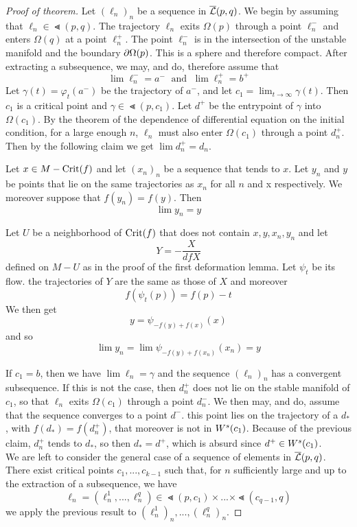\begin{proof}[Proof of theorem]
    Let $(\ell_n)_n$ be a sequence in ${\overline{\mathcal{L}} }(p, q)$.
    We begin by assuming that $\ell_n \in \Lt(p, q)$. The trajectory $\ell_n$ exits 
    $\Omega(p)$ through a point $\ell_n^-$ and enters $\Omega(q)$ at a point $\ell_n^+$.
    The point $\ell_n^-$ is in the intersection of the unstable manifold and the boundary
    ${ \partial } \Omega (p)$. This is a sphere and therefore compact. After extracting a 
    subsequence, we may, and do, therefore assume that
    \[ \lim \ell_n^- = a^- \; \text{ and } \; \lim \ell_n^+ = b^+ \]
    Let $\gamma(t) = \varphi_t(a^-)$ be the trajectory of $a^-$, and let 
    $c_1 = \lim_{t \to \infty} \gamma(t)$. Then $c_1$ is a critical point and 
    $\gamma \in \Lt (p, c_1)$. Let $d^+$ be the entrypoint of $\gamma$ into
    $\Omega (c_1)$. By the theorem of the dependence of differential equation on the 
    initial condition, for a large enough $n$, $\ell_n$ must also enter $\Omega(c_1)$
    through a point $d_n^+$. Then by the following claim we get $\lim d_n^+ = d_n$.
    \begin{claim*}
        Let $x \in M - { \operatorname{Crit} } (f)$ and let $(x_n)_n$ be a sequence that tends to $x$.
        Let $y_n$ and $y$ be points that lie on the same trajectories as $x_n$ for all
        $n$ and x respectively. We moreover suppose that $f(y_n) = f(y)$. Then 
        \[ \lim y_n = y \]
    \end{claim*}
    \begin{smallproof}
        Let $U$ be a neighborhood of ${ \operatorname{Crit} } (f)$ that does not contain 
        $x, y, x_n, y_n$ and let 
        \[ Y = - \frac{X}{dfX} \]
        defined on $M - U$ as in the proof of the first deformation lemma. Let 
        $\psi_t$ be its flow. the trajectories of $Y$ are the same as those of $X$
        and moreover 
        \[ f(\psi_t(p)) = f(p) - t \]
        We then get
        \[ y = \psi_{- f(y) + f(x)}(x)\]
        and so
        \[ \lim y_n = \lim \psi_{-f(y) + f(x_n)} (x_n) = y \]
    \end{smallproof}
    If $c_1 = b$, then we have $\lim \ell_n = \gamma$ and the sequence $(\ell_n)_n$ has a 
    convergent subsequence. If this is not the case, then $d_n^+$ does not lie on
    the stable manifold of $c_1$, so that $\ell_n$ exits $\Omega (c_1)$ through a point
    $d_n^-$. We then may, and do, assume that the sequence converges to a point 
    $d^-$. this point lies on the trajectory of a $d_{\ast}$, with 
    $f(d_{\ast}) = f(d_n^+)$, that moreover is not in ${ W^s } (c_1)$. Because of the 
    previous claim, $d_n^+$ tends to $d_{\ast}$, so then $d_{\ast} = d^+$, which is
    absurd since $d^+ \in { W^s }(c_1)$. \\
    We are left to consider the general case of a sequence of elements in ${\overline{\mathcal{L}} } (p, q)$.
    There exist critical points $c_1, ..., c_{k - 1}$ such that, for $n$ sufficiently
    large and up to the extraction of a subsequence, we have
    \[ \ell_n = (\ell^1_n, ..., \ell^q_n) \in \Lt(p, c_1) \times ... \times \Lt(c_{q - 1}, q) \]
    we apply the previous result to $(\ell^1_n)_n, ..., (\ell^q_n)_n$.
\end{proof}

